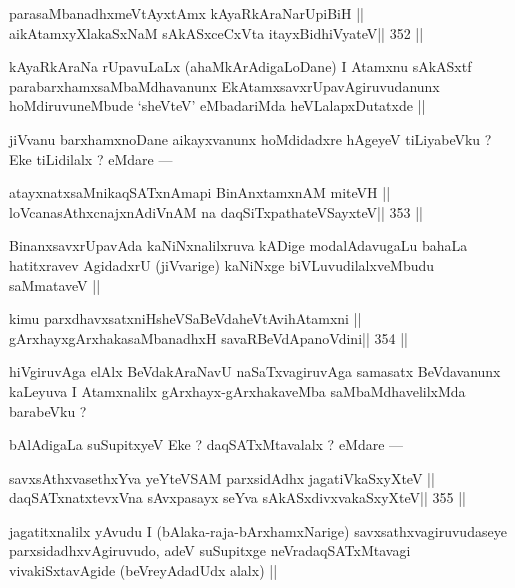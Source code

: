 \begin{shl}
parasaMbanadhxmeVtAyxtAmx kAyaRkAraNarUpiBiH ||
aikAtamxyXlakaSxNaM sAkASxceCxVta itayxBidhiVyateV\hfill || 352 ||
\end{shl}

\begin{artha}
kAyaRkAraNa rUpavuLaLx (ahaMkArAdigaLoDane) I Atamxnu sAkASxtf parabarxhamxsaMbaMdhavanunx EkAtamxsavxrUpavAgiruvudanunx hoMdiruvuneMbude `sheVteV' eMbadariMda heVLalapxDutatxde ||
\end{artha}

\begin{artha}
jiVvanu barxhamxnoDane aikayxvanunx hoMdidadxre hAgeyeV tiLiyabeVku ? Eke tiLidilalx ? eMdare ---
\end{artha}

\begin{shl}
atayxnatxsaMnikaqSATxnAmapi BinAnxtamxnAM miteVH ||
loVcanasAthxcnajxnAdiVnAM na daqSiTxpathateVSayxteV\hfill || 353 ||
\end{shl}

\begin{artha}
BinanxsavxrUpavAda kaNiNxnalilxruva kADige modalAdavugaLu bahaLa hatitxravev AgidadxrU (jiVvarige) kaNiNxge biVLuvudilalxveMbudu saMmataveV ||
\end{artha}

\begin{shl}
kimu parxdhavxsatxniHsheVSaBeVdaheVtAvihA\s\s tamxni ||
gArxhayxgArxhakasaMbanadhxH savaRBeVdApanoVdini\hfill || 354 ||
\end{shl}

\begin{artha}
hiVgiruvAga elAlx BeVdakAraNavU naSaTxvagiruvAga samasatx BeVdavanunx kaLeyuva I Atamxnalilx gArxhayx-gArxhakaveMba saMbaMdhavelilxMda barabeVku ?
\end{artha}

\begin{artha}
bAlAdigaLa suSupitxyeV Eke ? daqSATxMtavalalx ? eMdare ---
\end{artha}

\begin{shl}
savxsAthxvasethxYva yeYteVSAM parxsidAdhx jagatiVkaSxyXteV ||
daqSATxnatxtevxVna sAvxpasayx seYva sAkASxdivxvakaSxyXteV\hfill || 355 ||
\end{shl}

\begin{artha}
jagatitxnalilx yAvudu I (bAlaka-raja-bArxhamxNarige) savxsathxvagiruvudaseye parxsidadhxvAgiruvudo, adeV suSupitxge neVradaqSATxMtavagi vivakiSxtavAgide (beVreyAdadUdx alalx) ||
\end{artha}

